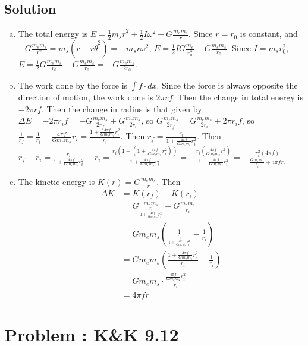 \documentclass[solutions]{esg8012pset}
\begin{document}
\begin{solution}
\subsection{Solution}
\begin{enumerate}[(a)]
  \item The total energy is $E = \frac12 m_s \dot r^2 + \frac12 I\omega^2 - G\frac{m_e m_s}{r}$.  Since $r = r_0$ is constant, and $-G \frac{m_e m_s}{r^2} = m_s (\ddot r - r\dot\theta^2) = - m_s r \omega^2$, $E = \frac12 I G \frac{m_e}{r_0^3} - G\frac{m_e m_s}{r_0}$.   Since $I = m_s r_0^2$, $E = \frac12 G \frac{m_e m_s}{r_0} - G\frac{m_e m_s}{r_0} = -G\frac{m_e m_s}{2r_0}$.
  \item The work done by the force is $\int f \cdot d x$.  Since the force is always opposite the direction of motion, the work done is $2\pi r f$.  Then the change in total energy is $-2\pi r f$.  Then the change in radius is that given by $\Delta E = -2\pi r_i f = -G\frac{m_e m_s}{2r_f} + G\frac{m_e m_s}{2r_i}$, so $G\frac{m_e m_s}{2r_f} = G\frac{m_e m_s}{2r_i} + 2\pi r_i f$, so $\frac{1}{r_f} = \frac{1}{r_i} + \frac{4\pi f}{G m_e m_s} r_i = \frac{1 + \frac{4\pi f}{G m_e m_s} r_i^2}{r_i}$.  Then $r_f = \frac{r_i}{1 + \frac{4\pi f}{G m_e m_s} r_i^2}$.  Then $r_f - r_i = \frac{r_i}{1 + \frac{4\pi f}{G m_e m_s} r_i^2} - r_i = \frac{r_i\left(1-\left(1 + \frac{4\pi f}{G m_e m_s} r_i^2\right)\right)}{1 + \frac{4\pi f}{G m_e m_s} r_i^2} = -\frac{r_i\left(\frac{4\pi f}{G m_e m_s} r_i^2\right)}{1 + \frac{4\pi f}{G m_e m_s} r_i^2} = -\frac{r_i^2(4\pi f)}{\frac{G m_e m_s}{r_i} + 4\pi f r_i}$
  \item The kinetic energy is $K(r) = G \frac{m_e m_s}{r}$.  Then \begin{align*}
 \Delta K & = K(r_f) - K(r_i) \\
  & = G \frac{m_e m_s}{\frac{r_i}{1 + \frac{4\pi f}{G m_e m_s} r_i^2}} - G \frac{m_e m_s}{r_i} \\
  & = G m_e m_s \left( \frac{1}{\frac{r_i}{1 + \frac{4\pi f}{G m_e m_s} r_i^2}} - \frac{1}{r_i}\right) \\
  & = G m_e m_s \left( \frac{1 + \frac{4\pi f}{G m_e m_s} r_i^2}{r_i} - \frac{1}{r_i}\right) \\
  & = G m_e m_s\cdot \frac{\frac{4\pi f}{G m_e m_s} r_i^2}{r_i} \\
  & = 4\pi f r
\end{align*}
\end{enumerate}
\section{Problem \thesection: K\&K 9.12}

\end{solution}
\end{document}
